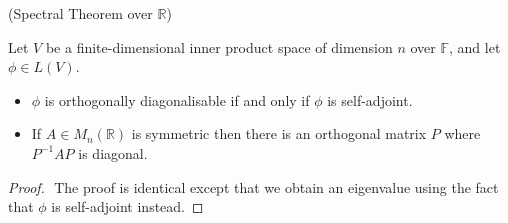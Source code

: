 \begin{theorem} (Spectral Theorem over $\mathbb{R}$)

  \noindent Let $V$ be a finite-dimensional inner product space of dimension $n$ over $\mathbb{F}$, and let $\phi \in L(V)$.

  \begin{itemize}
    \item $\phi$ is orthogonally diagonalisable if and only if $\phi$ is self-adjoint.
    \item If $A \in M_n(\mathbb{R})$ is symmetric then there is an orthogonal matrix $P$ where $P^{-1}AP$ is diagonal.
  \end{itemize}
\end{theorem}
\begin{proof} $ $ 
    The proof is identical except that we obtain an eigenvalue using the fact that $\phi$ is self-adjoint instead.
\end{proof}

